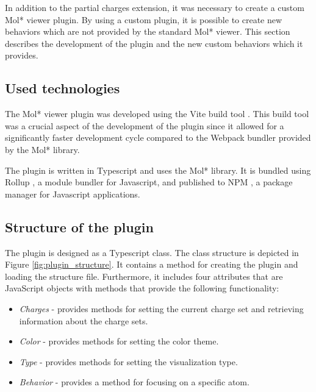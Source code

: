 \documentclass[
  digital,     %
  oneside,     %
  nosansbold,  %
  nocolorbold, %
  lof,         %
  lot,         %
]{fithesis4}
\begin{document}
In addition to the partial charges extension, it was necessary to create a custom Mol* viewer plugin. By using a custom plugin, it is possible to create new behaviors which are not provided by the standard Mol* viewer. This section describes the development of the plugin and the new custom behaviors which it provides.

\subsection{Used technologies}

The Mol* viewer plugin was developed using the Vite build tool \cite{vitejs}. This build tool was a crucial aspect of the development of the plugin since it allowed for a significantly faster development cycle compared to the Webpack bundler provided by the Mol* library.

The plugin is written in Typescript and uses the Mol* library. It is bundled using Rollup \cite{rollup}, a module bundler for Javascript, and published to NPM \cite{npm}, a package manager for Javascript applications.

\subsection{Structure of the plugin}

The plugin is designed as a Typescript class. The class structure is depicted in Figure \ref{fig:plugin_structure}. It contains a method for creating the plugin and loading the structure file. Furthermore, it includes four attributes that are JavaScript objects with methods that provide the following functionality:

\begin{itemize}
  \item \textit{Charges} - provides methods for setting the current charge set and retrieving information about the charge sets.
  \item \textit{Color} - provides methods for setting the color theme.
  \item \textit{Type} - provides methods for setting the visualization type.
  \item \textit{Behavior} - provides a method for focusing on a specific atom.
\end{itemize}
\end{document}

